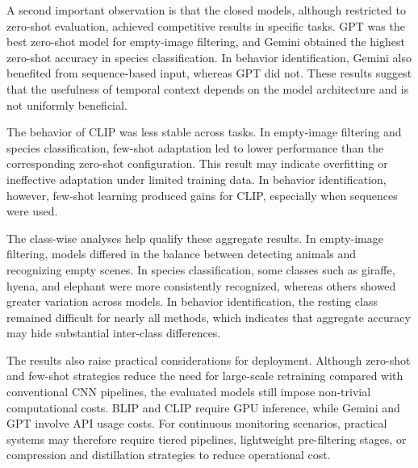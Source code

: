 A second important observation is that the closed models, although restricted to zero-shot evaluation, achieved competitive results in specific tasks. GPT was the best zero-shot model for empty-image filtering, and Gemini obtained the highest zero-shot accuracy in species classification. In behavior identification, Gemini also benefited from sequence-based input, whereas GPT did not. These results suggest that the usefulness of temporal context depends on the model architecture and is not uniformly beneficial.

The behavior of CLIP was less stable across tasks. In empty-image filtering and species classification, few-shot adaptation led to lower performance than the corresponding zero-shot configuration. This result may indicate overfitting or ineffective adaptation under limited training data. In behavior identification, however, few-shot learning produced gains for CLIP, especially when sequences were used.

The class-wise analyses help qualify these aggregate results. In empty-image filtering, models differed in the balance between detecting animals and recognizing empty scenes. In species classification, some classes such as giraffe, hyena, and elephant were more consistently recognized, whereas others showed greater variation across models. In behavior identification, the resting class remained difficult for nearly all methods, which indicates that aggregate accuracy may hide substantial inter-class differences.

The results also raise practical considerations for deployment. Although zero-shot and few-shot strategies reduce the need for large-scale retraining compared with conventional CNN pipelines, the evaluated models still impose non-trivial computational costs. BLIP and CLIP require GPU inference, while Gemini and GPT involve API usage costs. For continuous monitoring scenarios, practical systems may therefore require tiered pipelines, lightweight pre-filtering stages, or compression and distillation strategies to reduce operational cost.

